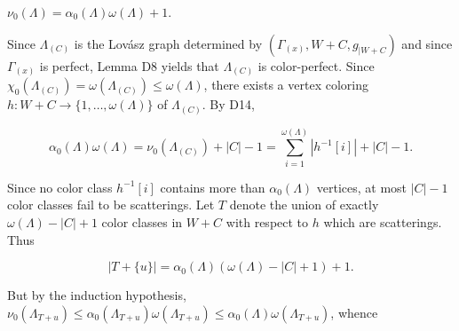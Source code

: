 $\nu_0(\Lambda) = \alpha_0(\Lambda)\omega(\Lambda) + 1$.

Since $\Lambda_{(C)}$ is the Lovász graph determined by $(\Gamma_{(x)}, W + C, g_{|W+C})$ and since $\Gamma_{(x)}$ is perfect, Lemma D8 yields that $\Lambda_{(C)}$ is color-perfect. Since $\chi_0(\Lambda_{(C)}) = \omega(\Lambda_{(C)}) \leq \omega(\Lambda)$, there exists a vertex coloring $h: W + C \rightarrow \{1, \ldots, \omega(\Lambda)\}$ of $\Lambda_{(C)}$. By D14,

$$\alpha_0(\Lambda)\omega(\Lambda) = \nu_0(\Lambda_{(C)}) + |C| - 1 = \sum_{i=1}^{\omega(\Lambda)} |h^{-1}[i]| + |C| - 1.$$

Since no color class $h^{-1}[i]$ contains more than $\alpha_0(\Lambda)$ vertices, at most $|C| - 1$ color classes fail to be scatterings. Let $T$ denote the union of exactly $\omega(\Lambda) - |C| + 1$ color classes in $W + C$ with respect to $h$ which are scatterings. Thus

$$|T + \{u\}| = \alpha_0(\Lambda)(\omega(\Lambda) - |C| + 1) + 1.$$

But by the induction hypothesis, $\nu_0(\Lambda_{T+{u}}) \leq \alpha_0(\Lambda_{T+{u}})\omega(\Lambda_{T+{u}}) \leq \alpha_0(\Lambda)\omega(\Lambda_{T+{u}})$, whence
